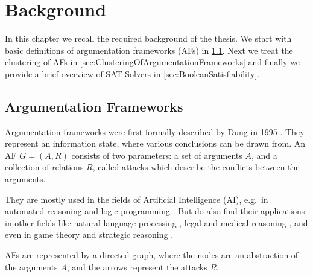 \chapter{Background}
\label{ch:Background}
In this chapter we recall the required background of the thesis. We start with basic definitions of argumentation frameworks (AFs) in \cref{sec:ArgumentationFrameworks}. Next we treat the clustering of AFs in \cref{sec:ClusteringOfArgumentationFrameworks} and finally we provide a brief overview of SAT-Solvers in \cref{sec:BooleanSatisfiability}.

\section{Argumentation Frameworks}
\label{sec:ArgumentationFrameworks}

Argumentation frameworks were first formally described by Dung in 1995 \cite{DUNG1995321}. They represent an information state, where various conclusions can be drawn from. An AF $G = (A, R)$ consists of two parameters: a set of arguments $A$, and a collection of relations $R$, called attacks which describe the conflicts between the arguments.

They are mostly used in the fields of Artificial Intelligence (AI), e.g.\ in automated reasoning and logic programming \cite{AFINAIARLP, AFINAIARLPexample}. But do also find their applications in other fields like natural language processing \cite{AFINNLP}, legal and medical reasoning \cite{legalAndMedicalReasoning}, and even in game theory and strategic reasoning \cite{AFinGames}.

AFs are represented by a directed graph, where the nodes are an abstraction of the arguments $A$, and the arrows represent the attacks $R$. 

